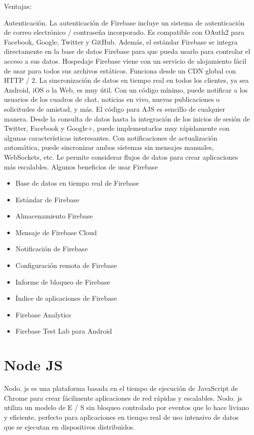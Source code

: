    Ventajas:
    
    Autenticación. La autenticación de Firebase incluye un sistema de autenticación de correo electrónico / contraseña incorporado. Es compatible con OAuth2 para Facebook, Google, Twitter y GitHub. Además, el estándar Firebase se integra directamente en la base de datos Firebase para que pueda usarlo para controlar el acceso a sus datos.
    Hospedaje Firebase viene con un servicio de alojamiento fácil de usar para todos sus archivos estáticos. Funciona desde un CDN global con HTTP / 2.
    La sincronización de datos en tiempo real en todos los clientes, ya sea Android, iOS o la Web, es muy útil. Con un código mínimo, puede notificar a los usuarios de los cuadros de chat, noticias en vivo, nuevas publicaciones o solicitudes de amistad, y más.
    El código para AJS es sencillo de cualquier manera. Desde la consulta de datos hasta la integración de los inicios de sesión de Twitter, Facebook y Google+, puede implementarlos muy rápidamente con algunas características interesantes.
    Con notificaciones de actualización automática, puede sincronizar ambos sistemas sin mensajes manuales, WebSockets, etc.
    Le permite considerar flujos de datos para crear aplicaciones más escalables.
    Algunos beneficios de usar Firebase
    
    \begin{itemize}
        \item Base de datos en tiempo real de Firebase
        \item Estándar de Firebase
        \item Almacenamiento Firebase
        \item Mensaje de Firebase Cloud
        \item Notificación de Firebase
        \item Configuración remota de Firebase
        \item Informe de bloqueo de Firebase
        \item Índice de aplicaciones de Firebase
        \item Firebase Analytics
        \item Firebase Test Lab para Android
    \end{itemize}
    
    \section{Node JS}
    
    Nodo. js es una plataforma basada en el tiempo de ejecución de JavaScript de Chrome para crear fácilmente aplicaciones de red rápidas y escalables. Nodo. js utiliza un modelo de E / S sin bloqueo controlado por eventos que lo hace liviano y eficiente, perfecto para aplicaciones en tiempo real de uso intensivo de datos que se ejecutan en dispositivos distribuidos.

